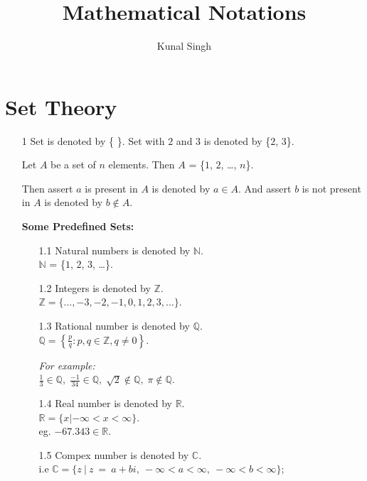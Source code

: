 \documentclass[14pt, a4paper]{article}
\title{Mathematical Notations}
\author{Kunal Singh}
\begin{document}
\maketitle
\section*{Set Theory}
    \begin{itemize}

        \item[1]
            Set is denoted by \{ \}.
            Set with $2$ and $3$ is denoted by \{$2$, $3$\}.

            Let $A$ be a set of $n$ elements.
            Then $A$ = \{$1$, $2$, \ldots, $n$\}.

            Then assert $a$ is present in $A$ is denoted by $a \in A$. And assert $b$ is not
            present in $A$ is denoted by $b \notin A$.

            {\bf{Some Predefined Sets:}}
            \begin{itemize}
                \item[1.1]
                Natural numbers is denoted by $\mathbb{N}$.
                \\ $\mathbb{N}$ = \{$1$, $2$, $3$, \ldots\}.

                \item[1.2]
                Integers is denoted by $\mathbb{Z}$.
                \\ $\mathbb{Z} = \{\ldots, -3, -2, -1, 0, 1, 2, 3, \ldots\}$.

                \item[1.3]
                Rational number is denoted by $\mathbb{Q}$.
                \\ $\mathbb{Q} =\left\{\frac{p}{q} : p , q \in \mathbb{Z}, q \neq 0 \right\}$.

                {\it{For example:\\}}
                $\frac{1}{3} \in \mathbb{Q}, \; \frac{-1}{34} \in \mathbb{Q}, \; \sqrt{2} \notin \mathbb{Q}, \;  \pi \notin \mathbb{Q}$.

                \item[1.4]
                Real number is denoted by $\mathbb{R}$.
                \\ $\mathbb{R} = \{x | -\infty < x < \infty\}$.
                \\ eg. $-67.343 \in \mathbb{R}$.

                \item[1.5]
                Compex number is denoted by $\mathbb{C}$.
                \\ i.e $\mathbb{C} = \{z \ | \ z \ = \ a + bi, \ -\infty < a < \infty, \ -\infty < b < \infty \}$;


\end{itemize}
\end{itemize}
\end{document}
